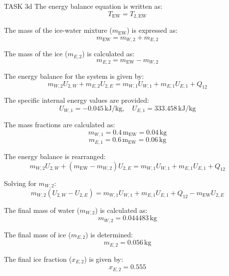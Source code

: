 TASK 3d  
The energy balance equation is written as:  
\[
T_{\text{EW}} = T_{2,\text{EW}}
\]  

The mass of the ice-water mixture (\(m_{\text{EW}}\)) is expressed as:  
\[
m_{\text{EW}} = m_{W,2} + m_{E,2}
\]  

The mass of the ice (\(m_{E,2}\)) is calculated as:  
\[
m_{E,2} = m_{\text{EW}} - m_{W,2}
\]  

The energy balance for the system is given by:  
\[
m_{W,2} U_{2,W} + m_{E,2} U_{2,E} = m_{W,1} U_{W,1} + m_{E,1} U_{E,1} + Q_{12}
\]  

The specific internal energy values are provided:  
\[
U_{W,1} = -0.045 \, \text{kJ/kg}, \quad U_{E,1} = 333.458 \, \text{kJ/kg}
\]  

The mass fractions are calculated as:  
\[
m_{W,1} = 0.4 \, \text{m}_{\text{EW}} = 0.04 \, \text{kg}
\]  
\[
m_{E,1} = 0.6 \, \text{m}_{\text{EW}} = 0.06 \, \text{kg}
\]  

The energy balance is rearranged:  
\[
m_{W,2} U_{2,W} + (m_{\text{EW}} - m_{W,2}) U_{2,E} = m_{W,1} U_{W,1} + m_{E,1} U_{E,1} + Q_{12}
\]  

Solving for \(m_{W,2}\):  
\[
m_{W,2} (U_{2,W} - U_{2,E}) = m_{W,1} U_{W,1} + m_{E,1} U_{E,1} + Q_{12} - m_{\text{EW}} U_{2,E}
\]  

The final mass of water (\(m_{W,2}\)) is calculated as:  
\[
m_{W,2} = 0.044483 \, \text{kg}
\]  

The final mass of ice (\(m_{E,2}\)) is determined:  
\[
m_{E,2} = 0.056 \, \text{kg}
\]  

The final ice fraction (\(x_{E,2}\)) is given by:  
\[
x_{E,2} = 0.555
\]